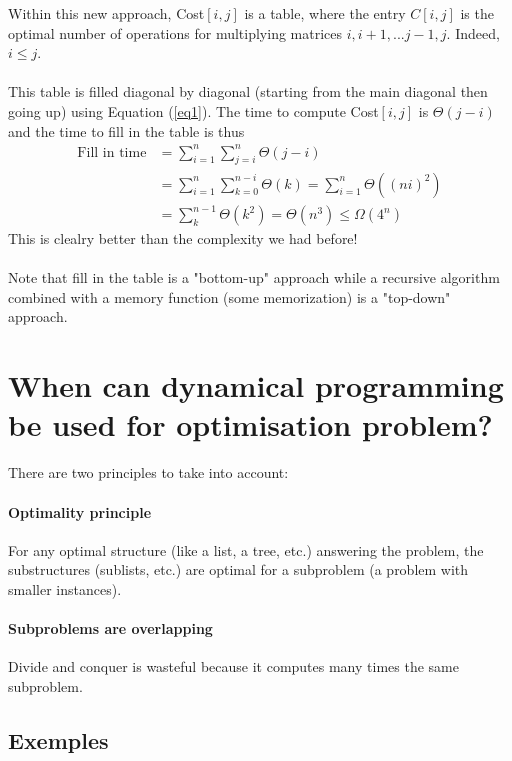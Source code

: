 Within this new approach, Cost$[i,j]$ is a table, where the entry $C[i,j]$ is the optimal number of operations for multiplying matrices $i,i+1,...j-1,j$. Indeed, $i\leq j$.
\\ \\
This table is filled diagonal by diagonal (starting from the main diagonal then going up) using Equation (\ref{eq1}). The time to compute Cost$[i,j]$ is $\Theta (j-i)$ and the time to fill in the table is thus 
\begin{align*}
\text{Fill in time} & = \sum_{i=1}^n \sum_{j=i}^n \Theta (j-i) \\
& = \sum_{i=1}^n \sum_{k=0}^{n-i} \Theta (k) = \sum_{i=1}^n \Theta ( (ni)^2) \\
& = \sum_k^{n-1} \Theta (k^2) = \Theta (n^3) \leq \Omega (4^n)
\end{align*} 
This is clealry better than the complexity we had before!
\\ \\
Note that fill in the table is a "bottom-up" approach while a recursive algorithm combined with a memory function (some memorization) is a "top-down" approach.

\section{When can dynamical programming be used for optimisation problem?}

There are two principles to take into account:

\paragraph{Optimality principle} For any optimal structure (like a list, a tree, etc.) answering the problem, the substructures (sublists, etc.) are optimal for a subproblem (a problem with smaller instances). 

\paragraph{Subproblems are overlapping} Divide and conquer is wasteful because it computes many times the same subproblem.

\subsection{Exemples}

